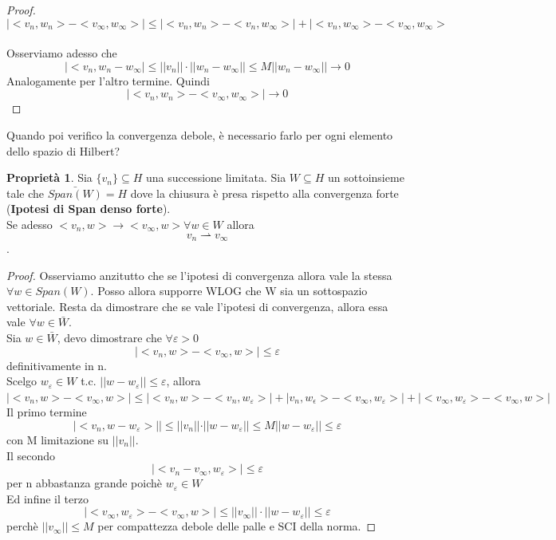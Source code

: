 \documentclass[a4paper]{book}
\theoremstyle{definition}
\theoremstyle{remark}
\theoremstyle{definition}
\newtheorem{prop}{Proprietà}
\begin{document}
\begin{proof}
	\[
	|<v_n ,w_n> - <v_\infty, w_\infty>| \le |<v_n, w_n> - <v_n, w_\infty>| + |<v_n, w_\infty> - <v_\infty, w_\infty>
	\]
	\\
	Osserviamo adesso che
	$$|<v_n, w_n - w_\infty| \le ||v_n||\cdot ||w_n - w_\infty|| \le M ||w_n - w_\infty|| \to 0$$
	Analogamente per l'altro termine. Quindi
	$$|<v_n ,w_n> - <v_\infty, w_\infty>| \to 0$$
\end{proof}

Quando poi verifico la convergenza debole, è necessario farlo per ogni elemento dello spazio di Hilbert?
\\
\begin{prop}
	Sia $\{v_n\} \subseteq H$ una successione limitata. Sia $W \subseteq H$ un sottoinsieme tale che $\bar{Span(W)} = H$ dove la chiusura è presa rispetto alla convergenza forte (\textbf{Ipotesi di Span denso forte}).
	\\
	Se adesso $<v_n, w> \to <v_\infty, w> \forall w \in W$ allora $$v_n \rightharpoonup v_\infty$$.
\end{prop}

\begin{proof}
	Osserviamo anzitutto che se l'ipotesi di convergenza allora vale la stessa $\forall w \in Span(W)$. Posso allora supporre WLOG che W sia un sottospazio vettoriale. Resta da dimostrare che se vale l'ipotesi di convergenza, allora essa vale $\forall w \in \bar{W}$. \\
	Sia $w \in \bar{W}$, devo dimostrare che $\forall \varepsilon > 0$ 
	$$|<v_n ,w> - <v_\infty, w>| \le \varepsilon$$ definitivamente in n.
	\\
	Scelgo $w_\varepsilon \in W$ t.c. $||w - w_\varepsilon|| \le \varepsilon$, allora
	$|<v_n ,w> - <v_\infty, w>| \le |<v_n ,w> - <v_n, w_\varepsilon>| + |v_n, w_\epsilon> - <v_\infty, w_\varepsilon>| + |<v_\infty, w_\varepsilon> - <v_\infty, w>|$
	\\
	Il primo termine 
	$$|<v_n ,w - w_\varepsilon>|| \le ||v_n||\cdot ||w - w_\varepsilon|| \le M ||w - w_\varepsilon|| \le \varepsilon$$
	con M limitazione su $||v_n||$.
	\\
	Il secondo 
	$$|<v_n - v_\infty, w_\varepsilon>| \le \varepsilon $$ per n abbastanza grande poichè $w_\varepsilon \in W$
	\\
	Ed infine il terzo 
	$$|<v_\infty, w_\varepsilon> - <v_\infty, w>| \le ||v_\infty||\cdot ||w - w_\varepsilon|| \le \varepsilon$$ perchè $||v_\infty|| \le M$ per compattezza debole delle palle e SCI della norma.
\end{proof}
\end{document}
